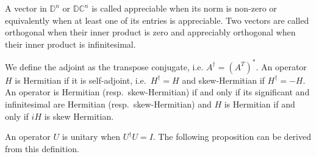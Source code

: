 \documentclass{article}
\newcommand{\D}{\mathbb{D}}
\newcommand{\DC}{\mathbb{DC}}
\begin{document}
A vector in $\D^n$ or $\DC^n$ is called appreciable when its norm is non-zero or equivalently when at least one of its entries is appreciable. Two vectors are called orthogonal when their inner product is zero and appreciably orthogonal when their inner product is infinitesimal.

We define the adjoint as the transpose conjugate, i.e. $A^\dagger = (A^T)^*$. An operator $H$ is Hermitian if it is self-adjoint, i.e.\ $H^\dagger = H$ and skew-Hermitian if $H^\dagger = -H$. An operator is Hermitian (resp.\ skew-Hermitian) if and only if its significant and infinitesimal are Hermitian (resp.\ skew-Hermitian) and $H$ is Hermitian if and only if $iH$ is skew Hermitian.

An operator $U$ is unitary when $U^\dagger U = I$. The following proposition can be derived from this definition.
\end{document}

